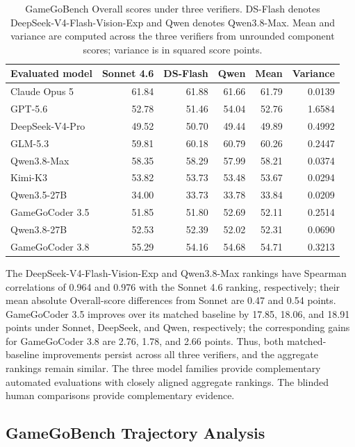 \documentclass{article}
\begin{document}
\begin{table}[t]
\centering
\caption{GameGoBench Overall scores under three verifiers. DS-Flash denotes DeepSeek-V4-Flash-Vision-Exp and Qwen denotes Qwen3.8-Max. Mean and variance are computed across the three verifiers from unrounded component scores; variance is in squared score points.}
\label{tab:verifier_sensitivity}
\small
\setlength{\tabcolsep}{4pt}
\begin{tabular}{@{}lrrrrr@{}}
\toprule
Evaluated model & Sonnet 4.6 & DS-Flash & Qwen & Mean & Variance \\
\midrule
Claude Opus 5 & 61.84 & 61.88 & 61.66 & 61.79 & 0.0139 \\
GPT-5.6 & 52.78 & 51.46 & 54.04 & 52.76 & 1.6584 \\
DeepSeek-V4-Pro & 49.52 & 50.70 & 49.44 & 49.89 & 0.4992 \\
GLM-5.3 & 59.81 & 60.18 & 60.79 & 60.26 & 0.2447 \\
Qwen3.8-Max & 58.35 & 58.29 & 57.99 & 58.21 & 0.0374 \\
Kimi-K3 & 53.82 & 53.73 & 53.48 & 53.67 & 0.0294 \\
Qwen3.5-27B & 34.00 & 33.73 & 33.78 & 33.84 & 0.0209 \\
GameGoCoder 3.5 & 51.85 & 51.80 & 52.69 & 52.11 & 0.2514 \\
Qwen3.8-27B & 52.53 & 52.39 & 52.02 & 52.31 & 0.0690 \\
GameGoCoder 3.8 & 55.29 & 54.16 & 54.68 & 54.71 & 0.3213 \\
\bottomrule
\end{tabular}
\end{table}

The DeepSeek-V4-Flash-Vision-Exp and Qwen3.8-Max rankings have Spearman correlations of 0.964 and 0.976 with the Sonnet 4.6 ranking, respectively; their mean absolute Overall-score differences from Sonnet are 0.47 and 0.54 points. GameGoCoder 3.5 improves over its matched baseline by 17.85, 18.06, and 18.91 points under Sonnet, DeepSeek, and Qwen, respectively; the corresponding gains for GameGoCoder 3.8 are 2.76, 1.78, and 2.66 points. Thus, both matched-baseline improvements persist across all three verifiers, and the aggregate rankings remain similar. The three model families provide complementary automated evaluations with closely aligned aggregate rankings. The blinded human comparisons provide complementary evidence.

\subsection{GameGoBench Trajectory Analysis}
\label{app:gamegobench_trajectory}
\end{document}
